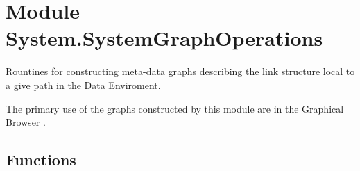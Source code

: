 %
%
%


\section{Module System.SystemGraphOperations}

    \label{System:SystemGraphOperations}
Rountines for constructing meta-data graphs describing the link structure 
local to a give path in the Data Enviroment.

The primary use of the graphs constructed by this module are in the 
Graphical Browser .



  \subsection{Functions}

    \label{System:SystemGraphOperations:MakeLocalLinkList}

    \vspace{0.5ex}

